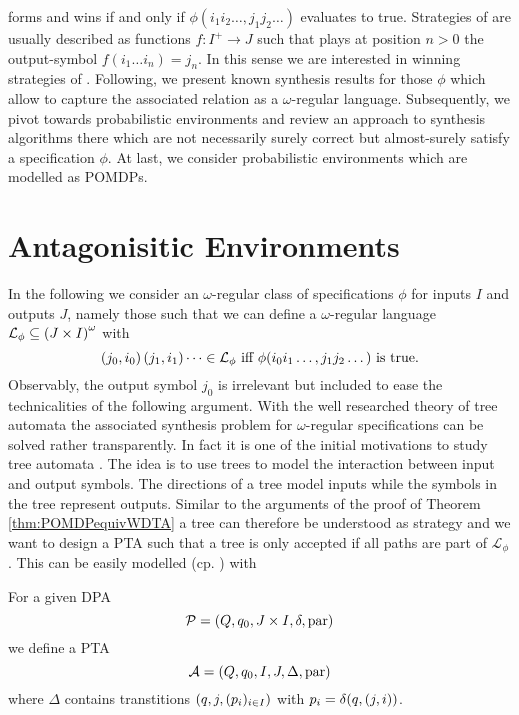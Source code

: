 forms and \outputp{} wins if and only if 
$\phi(i_{1}i_{2}\dots,j_{1}j_{2}\dots)$ evaluates to true. Strategies of 
\outputp{} are usually described as functions $f:I^{+}\rightarrow J$ such that
\outputp{} plays at position $n>0$ the output-symbol 
$f(i_{1}\dots i_{n}) = j_{n}$. In this sense we are interested in winning 
strategies of \outputp{}. Following, we present known synthesis results 
for those $\phi$ which allow to capture the associated relation as a 
$\omega$-regular language. Subsequently, we pivot towards probabilistic 
environments and review an approach to synthesis algorithms there which are not 
necessarily surely correct but almost-surely satisfy a specification $\phi$. 
At last, we consider probabilistic environments which are modelled as
\acp{POMDP}.

\section{Antagonisitic Environments}
In the following we consider an $\omega$-regular class of specifications 
$\phi$ for inputs $I$ and outputs $J$, namely those such that we can define a 
$\omega$-regular language $\mathcal{L}_{\phi}\subseteq 
\left(J\times I\right)^{\omega}$ with
\begin{equation}
  \left(j_{0}, i_{0}\right)\left(j_{1}, i_{1}\right)\dots\in\mathcal{L}_{\phi}
  \text{ iff }
  \phi(i_{0}i_{1}\dots, j_{1}j_{2}\dots)\text{ is true.}
  \label{eq:omegaregularphi}
\end{equation}
Observably, the output symbol $j_{0}$ is irrelevant but included to ease the 
technicalities of the following argument. With the well researched theory of
tree automata the associated synthesis problem for $\omega$-regular 
specifications can be solved rather transparently. In fact it is one of the 
initial motivations to study tree automata \cite{AutoInfObj}. The idea is to 
use trees to model the interaction between input and output symbols. The 
directions of a tree model inputs while the symbols in the tree represent 
outputs. Similar to the arguments of the proof of Theorem 
\ref{thm:POMDPequivWDTA} a tree can therefore be understood as strategy and we 
want to design a \ac{PTA} such that a tree is only accepted if all paths are 
part of $\mathcal{L}_{\phi}$. This can be easily modelled 
(cp. \cite[Lemma 15]{AutoInfObj}) with
\begin{definition}
  For a given \ac{DPA}
  \begin{equation*}
    \mathcal{P} = \left(Q, q_{0}, J\times I, \delta, \operatorname{par}\right)
  \end{equation*}
  we define a \ac{PTA}
  \begin{equation*}
    \mathcal{A} = \left(Q, q_{0}, I, J, \Delta, \operatorname{par}\right)
  \end{equation*}
  where $\Delta$ contains transtitions $\left(q, j, (p_{i})_{i\in I}\right)$ with
  $p_{i} = \delta(q, \left(j, i\right))$.
\end{definition}
